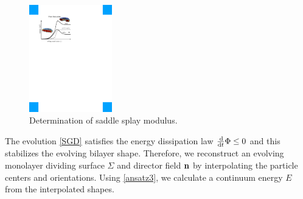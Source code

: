 \begin{figure}
\centerline{\includegraphics[width=0.32\textwidth]{Figures/SaddleSplayDiagram.pdf}}
\caption{\label{fig:saddle_splay} \footnotesize Determination of
  saddle splay modulus.}
\end{figure}
%
The evolution \eqref{SGD} satisfies the energy dissipation law $\frac{\dif }{\dif t} \Phi \leq 0$
and this stabilizes the evolving bilayer shape.
Therefore, we reconstruct an evolving monolayer dividing surface $\Sigma$ and director field ${\bf n}$ by
interpolating the particle centers and orientations. Using \eqref{ansatz3}, we calculate a continuum energy $E$ from the interpolated shapes.


%
%

